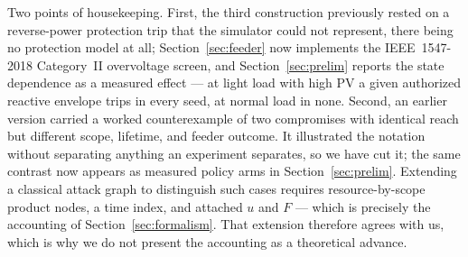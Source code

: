 Two points of housekeeping. First, the third construction previously rested on a reverse-power
protection trip that the simulator could not represent, there being no protection model at all;
Section~\ref{sec:feeder} now implements the IEEE~1547-2018 Category~II overvoltage screen, and
Section~\ref{sec:prelim} reports the state dependence as a measured effect --- at light load with
high PV a given authorized reactive envelope trips in every seed, at normal load in none. Second,
an earlier version carried a worked counterexample of two compromises with identical reach but
different scope, lifetime, and feeder outcome. It illustrated the notation without separating
anything an experiment separates, so we have cut it; the same contrast now appears as measured
policy arms in Section~\ref{sec:prelim}. Extending a classical attack graph to distinguish such
cases requires resource-by-scope product nodes, a time index, and attached $u$ and $F$ --- which
is precisely the accounting of Section~\ref{sec:formalism}. That extension therefore agrees with
us, which is why we do not present the accounting as a theoretical advance.
